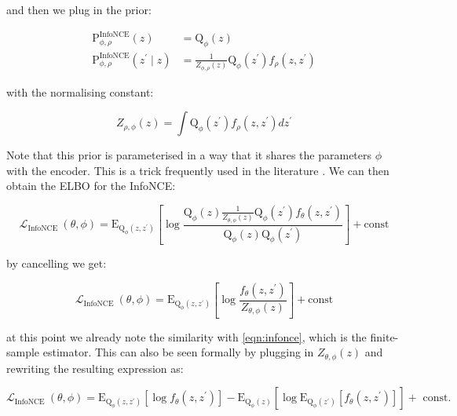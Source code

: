 \documentclass[tablecaption=bottom,wcp]{jmlr} %
\begin{document}
and then we plug in the prior:


\begin{equation}
\begin{aligned}
\mathrm{P}_{\phi,\rho}^{\operatorname{InfoNCE}}(z) & =\mathrm{Q}_\phi(z) \\
\mathrm{P}_{\phi, \rho}^{\operatorname{InfoNCE}}\left(z^{\prime} \mid z\right) & =\frac{1}{Z_{\phi, \rho}(z)} \mathrm{Q}_\phi\left(z^{\prime}\right) f_\rho\left(z, z^{\prime}\right)
\end{aligned}
\end{equation}

with the normalising constant: 

\begin{equation}
Z_{\rho, \phi}(z) = \int \mathrm{Q}_\phi\left(z^{\prime}\right) f_\rho\left(z, z^{\prime} \right)d z^{\prime}
\end{equation}

 Note that this prior is parameterised in a way that it shares the parameters $\phi$ with the encoder. This is a trick frequently used in the literature  \citep{zhao2018information,ustyuzhaninov20a}. We can then obtain the ELBO for the InfoNCE:

\begin{equation}
\mathcal{L}_{\text {InfoNCE }}(\theta, \phi)=\mathrm{E}_{\mathrm{Q}_\phi\left(z, z^{\prime}\right)}\left[\log \frac{\mathrm{Q}_\phi(z) \frac{1}{Z_{\theta, \phi}(z)} \mathrm{Q}_\phi\left(z^{\prime}\right) f_\theta\left(z, z^{\prime}\right)}{\mathrm{Q}_\phi(z) \mathrm{Q}_\phi\left(z^{\prime}\right)}\right] + \text{const}
\end{equation}

by cancelling we get: 

\begin{equation}
\mathcal{L}_{\text {InfoNCE }}(\theta, \phi)=\mathrm{E}_{\mathrm{Q}_\phi\left(z, z^{\prime}\right)}\left[\log \frac{f_\theta\left(z, z^{\prime}\right)}{Z_{\theta, \phi}(z)}\right] + \text{const}
\end{equation}


at this point we already note the similarity with \cref{eqn:infonce}, which is the finite-sample estimator. This can also be seen formally by plugging in $Z_{\theta, \phi}(z)$ and rewriting the resulting expression as:

\begin{equation}
 \mathcal{L}_{\text {InfoNCE }}(\theta, \phi)=\mathrm{E}_{\mathrm{Q}_\phi\left(z, z^{\prime}\right)}\left[\log f_\theta\left(z, z^{\prime}\right)\right] 
-\mathrm{E}_{\mathrm{Q}_\phi(z)}\left[\log \mathrm{E}_{\mathrm{Q}_\phi\left(z^{\prime}\right)}\left[f_\theta\left(z, z^{\prime}\right)\right]\right]+\text { const. }
\end{equation}
\end{document}
